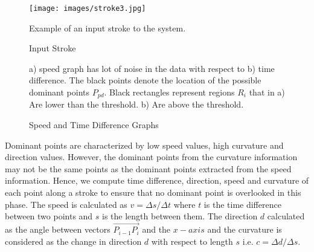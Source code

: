 \documentclass[preprint,1p,times,review]{elsarticle}
\begin{document}
 \begin{figure}[h]
	\centering
		\texttt{[image: images/stroke3.jpg]}
	\caption{Input Stroke} Example of an input stroke to the system.
	\label{fig:orignalStroke}
\end{figure}

 \begin{figure}
	\centering
			\hfill
	\caption{Speed and Time Difference Graphs}  a) speed graph has lot of
noise in the data with respect to b) time difference.   The black points denote
the location of the possible dominant points $P_{pd}$. Black rectangles
represent regions $R_i$ that in a) Are lower than the threshold. b) Are above
the threshold.
	\label{fig:speed2Distance}
\end{figure}

Dominant points are characterized by low speed values, high curvature and direction values. However, the dominant points from the curvature information may not be the same points as the dominant points extracted from the speed information. Hence, we compute time difference, direction, speed and curvature of each point along a stroke to ensure that no dominant point is overlooked in this phase. The speed is calculated as $v=\Delta s/\Delta t$ where $t$ is the time difference between two points and $s$ is the length between them. The direction $d$ calculated as the angle between vectors $\overrightarrow {P_{i - 1} P_i }$ and the $x-axis$ and the curvature is considered as the change in direction $d$ with respect to length $s$ i.e. $c= \Delta d/\Delta s$.
\end{document}
